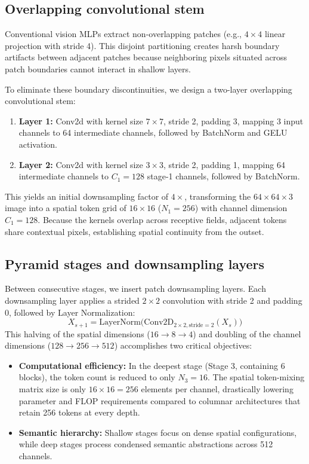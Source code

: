 \subsection{Overlapping convolutional stem}
\label{subsection:overlapping_stem}
Conventional vision MLPs extract non-overlapping patches (e.g., $4 \times 4$ linear projection with stride 4). This disjoint partitioning creates harsh boundary artifacts between adjacent patches because neighboring pixels situated across patch boundaries cannot interact in shallow layers.

To eliminate these boundary discontinuities, we design a two-layer overlapping convolutional stem:
\begin{enumerate}
    \item \textbf{Layer 1:} Conv2d with kernel size $7 \times 7$, stride 2, padding 3, mapping 3 input channels to 64 intermediate channels, followed by BatchNorm and GELU activation.
    \item \textbf{Layer 2:} Conv2d with kernel size $3 \times 3$, stride 2, padding 1, mapping 64 intermediate channels to $C_1 = 128$ stage-1 channels, followed by BatchNorm.
\end{enumerate}
This yields an initial downsampling factor of $4\times$, transforming the $64 \times 64 \times 3$ image into a spatial token grid of $16 \times 16$ ($N_1 = 256$) with channel dimension $C_1 = 128$. Because the kernels overlap across receptive fields, adjacent tokens share contextual pixels, establishing spatial continuity from the outset.

\subsection{Pyramid stages and downsampling layers}
\label{subsection:pyramid_stages}
Between consecutive stages, we insert patch downsampling layers. Each downsampling layer applies a strided $2 \times 2$ convolution with stride 2 and padding 0, followed by Layer Normalization:
\begin{equation}
    X_{s+1} = \text{LayerNorm}\Big(\text{Conv2D}_{2\times 2, \text{stride}=2}(X_s)\Big)
\end{equation}
This halving of the spatial dimensions ($16 \to 8 \to 4$) and doubling of the channel dimensions ($128 \to 256 \to 512$) accomplishes two critical objectives:
\begin{itemize}
    \item \textbf{Computational efficiency:} In the deepest stage (Stage 3, containing 6 blocks), the token count is reduced to only $N_3 = 16$. The spatial token-mixing matrix size is only $16 \times 16 = 256$ elements per channel, drastically lowering parameter and FLOP requirements compared to columnar architectures that retain 256 tokens at every depth.
    \item \textbf{Semantic hierarchy:} Shallow stages focus on dense spatial configurations, while deep stages process condensed semantic abstractions across 512 channels.
\end{itemize}

